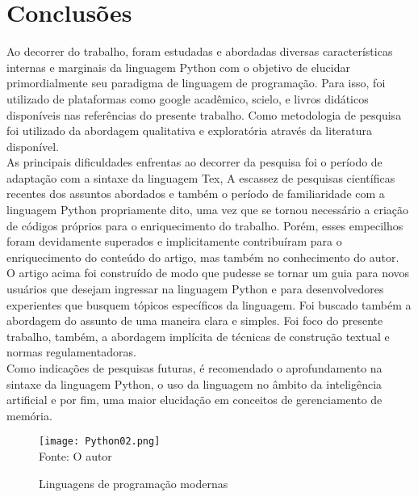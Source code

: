 

\chapter{Conclus\~{o}es}

Ao decorrer do trabalho, foram estudadas e abordadas diversas características internas e marginais da linguagem Python com o objetivo de elucidar primordialmente seu paradigma de linguagem de programação. Para isso, foi utilizado de plataformas como google acadêmico, scielo, e livros didáticos disponíveis nas referências do presente trabalho. Como metodologia de pesquisa foi utilizado da abordagem qualitativa e exploratória através da literatura disponível.\\
As principais dificuldades enfrentas ao decorrer da pesquisa foi o período de adaptação com a sintaxe da linguagem Tex, A escassez de pesquisas científicas recentes dos assuntos abordados e também o período de familiaridade com a linguagem Python propriamente dito, uma vez que se tornou necessário a criação de códigos próprios para o enriquecimento do trabalho. Porém, esses empecilhos foram devidamente superados e implicitamente contribuíram para o enriquecimento do conteúdo do artigo, mas também no conhecimento do autor.\\
O artigo acima foi construído de modo que pudesse se tornar um guia para novos usuários que desejam ingressar na linguagem Python e para desenvolvedores experientes que busquem tópicos específicos da linguagem. Foi buscado também a abordagem do assunto de uma maneira clara e simples. Foi foco do presente trabalho, também, a abordagem implícita de técnicas de construção textual e normas regulamentadoras.\\
Como indicações de pesquisas futuras, é recomendado o aprofundamento na sintaxe da linguagem Python, o uso da linguagem no âmbito da inteligência artificial e por fim, uma maior elucidação em conceitos de gerenciamento de memória. 


   \begin{figure}[H]
    \begin{center}
        \caption{Linguagens de programa\c{c}\~{a}o modernas} \label{ling2}
        \texttt{[image: Python02.png]} \\
        {\tiny \sf Fonte: O autor }
    \end{center}
   \end{figure} 